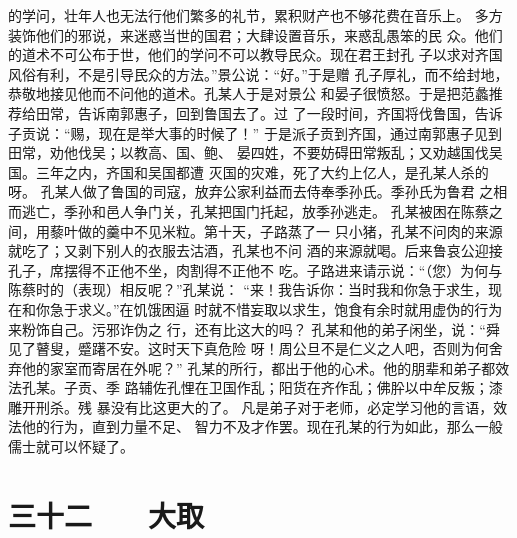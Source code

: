 \documentclass[12pt,UTF8]{ctexbook}
\begin{document}
的学问，壮年人也无法行他们繁多的礼节，累积财产也不够花费在音乐上。 
多方装饰他们的邪说，来迷惑当世的国君；大肆设置音乐，来惑乱愚笨的民 
众。他们的道术不可公布于世，他们的学问不可以教导民众。现在君王封孔 
子以求对齐国风俗有利，不是引导民众的方法。”景公说：“好。”于是赠 
孔子厚礼，而不给封地，恭敬地接见他而不问他的道术。孔某人于是对景公 
和晏子很愤怒。于是把范蠡推荐给田常，告诉南郭惠子，回到鲁国去了。过 
了一段时间，齐国将伐鲁国，告诉子贡说：“赐，现在是举大事的时候了！” 
于是派子贡到齐国，通过南郭惠子见到田常，劝他伐吴；以教高、国、鲍、 
晏四姓，不要妨碍田常叛乱；又劝越国伐吴国。三年之内，齐国和吴国都遭 
灭国的灾难，死了大约上亿人，是孔某人杀的呀。 
孔某人做了鲁国的司寇，放弃公家利益而去侍奉季孙氏。季孙氏为鲁君 
之相而逃亡，季孙和邑人争门关，孔某把国门托起，放季孙逃走。 
孔某被困在陈蔡之间，用藜叶做的羹中不见米粒。第十天，子路蒸了一 
只小猪，孔某不问肉的来源就吃了；又剥下别人的衣服去沽酒，孔某也不问 
酒的来源就喝。后来鲁哀公迎接孔子，席摆得不正他不坐，肉割得不正他不 
吃。子路进来请示说：“（您）为何与陈蔡时的（表现）相反呢？”孔某说： 
“来！我告诉你：当时我和你急于求生，现在和你急于求义。”在饥饿困逼 
时就不惜妄取以求生，饱食有余时就用虚伪的行为来粉饰自己。污邪诈伪之 
行，还有比这大的吗？ 
孔某和他的弟子闲坐，说：“舜见了瞽叟，蹙躇不安。这时天下真危险 
呀！周公旦不是仁义之人吧，否则为何舍弃他的家室而寄居在外呢？” 
孔某的所行，都出于他的心术。他的朋辈和弟子都效法孔某。子贡、季 
路辅佐孔悝在卫国作乱；阳货在齐作乱；佛肸以中牟反叛；漆雕开刑杀。残 
暴没有比这更大的了。 
凡是弟子对于老师，必定学习他的言语，效法他的行为，直到力量不足、 
智力不及才作罢。现在孔某的行为如此，那么一般儒士就可以怀疑了。 

\chapter{三十二　　大取}
\end{document}
